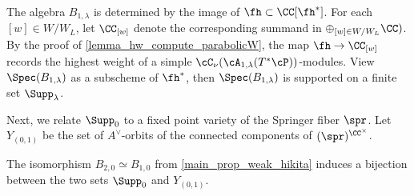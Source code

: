 \documentclass[12pt]{amsart}
\begin{document}
The algebra $B_{1,\lambda}$ is determined by the image of $\fh\subset \CC[\fh^*]$. For each $[w]\in W/W_{L}$, let $\CC_{[w]}$ denote the corresponding summand in $\oplus_{[w]\in W/W_{L}} \CC)$. By the proof of \cref{lemma_hw_compute_parabolicW}, the map $\fh\rightarrow \CC_{[w]}$ records the highest weight of a simple $\cC_\nu(\cA_{1,\lambda}(T^*\cP))$-modules. View $\Spec(B_{1,\lambda})$ as a subscheme of $\fh^*$, then $\Spec(B_{1,\lambda})$ is supported on a finite set $\Supp_\lambda$.  



Next, we relate $\Supp_0$ to a fixed point variety of the Springer fiber $\spr$. Let $Y_{(0,1)}$ be the set of $A^\vee$-orbits of the connected components of $(\spr)^{\CC^\times}$. 
\begin{prop} \label{support and component}
    The isomorphism $B_{2,0}\simeq B_{1,0}$ from \cref{main_prop_weak_hikita} induces a bijection between the two sets $\Supp_0$ and $Y_{(0,1)}$. 
\end{prop}
\end{document}
